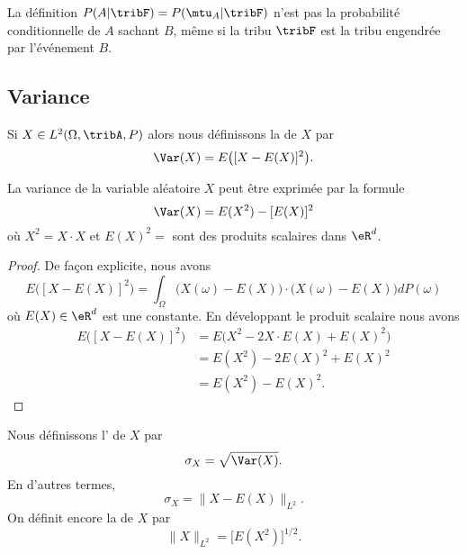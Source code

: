 \begin{remark}
    La définition \(P(A|\tribF)=P(\mtu_A|\tribF)\) n'est pas la probabilité conditionnelle de \( A\) sachant \( B\), même si la tribu \( \tribF\) est la tribu engendrée par l'événement \( B\).
\end{remark}

\subsection{Variance}

Si \( X\in L^2(\Omega,\tribA,P)\) alors nous définissons la  de \( X\) par
\begin{equation}
    \Var(X)=E\big( [X-E(X)]^2 \big).
\end{equation}

\begin{proposition}     \label{PrropVarAlterfrom}
    La variance de la variable aléatoire \( X\) peut être exprimée par la formule
    \begin{equation}
        \Var(X)=E(X^2)-[E(X)]^2
    \end{equation}
    où \( X^2=X\cdot X\) et \( E(X)^2=\) sont des produits scalaires dans \( \eR^d\).
\end{proposition}

\begin{proof}
    De façon explicite, nous avons
    \begin{equation}
        E\big( [X-E(X)]^2 \big)=\int_{\Omega}\big( X(\omega)-E(X) \big)\cdot\big( X(\omega)-E(X) \big)dP(\omega)
    \end{equation}
    où \( E(X)\in\eR^d\) est une constante. En développant le produit scalaire nous avons
    \begin{subequations}
        \begin{align}
            E\big( [X-E(X)]^2 \big)&=E\big( X^2-2X\cdot E(X)+E(X)^2 \big)\\
            &=E(X^2)-2E(X)^2+E(X)^2\\
            &=E(X^2)-E(X)^2.
        \end{align}
    \end{subequations}
\end{proof}


Nous définissons l' de \( X\) par
\begin{equation}
    \sigma_X=\sqrt{\Var(X)}.
\end{equation}
En d'autres termes,
\begin{equation}
    \sigma_X=\| X-E(X) \|_{L^2}.
\end{equation}
On définit encore la  de \( X\) par
\begin{equation}
    \| X \|_{L^2}=\big[ E(X^2) \big]^{1/2}.
\end{equation}

